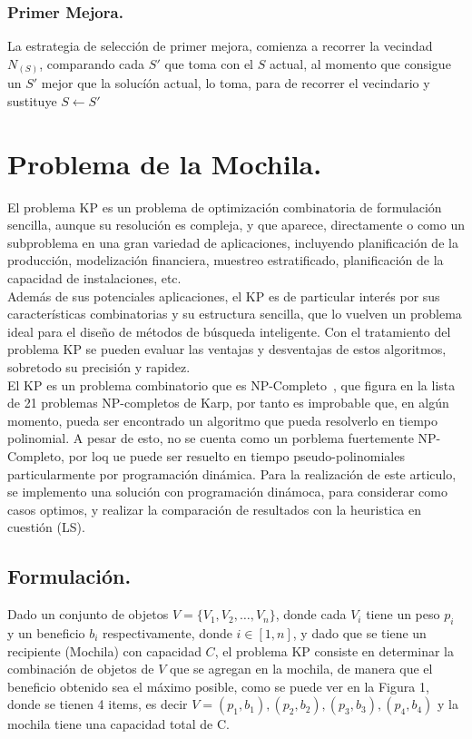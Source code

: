 \documentclass{ci5652}
\begin{document}
		\subsubsection{Primer Mejora.}
			La estrategia de selección de primer mejora, comienza a recorrer la vecindad $N_(S)$, comparando cada $S'$ que toma con el $S$ actual, al momento que consigue un $S'$ mejor que la solucíón actual, lo toma, para de recorrer el vecindario y sustituye $S \leftarrow S'$	
	
\section{Problema de la Mochila.}
	El problema KP es un problema de optimización combinatoria de formulación sencilla, aunque su resolución es compleja, y que aparece, directamente o como un subproblema en una gran variedad de aplicaciones, incluyendo  planificación de la producción, modelización financiera, muestreo estratificado, planificación de la capacidad de instalaciones, etc.\\
	Además de sus potenciales aplicaciones, el KP es de particular interés por sus características combinatorias y su estructura sencilla, que lo vuelven un problema ideal para el diseño de métodos de búsqueda inteligente. Con el tratamiento del problema KP se pueden evaluar las ventajas y desventajas de estos algoritmos, sobretodo su precisión y rapidez.\\
	El KP es un problema combinatorio que es NP-Completo~\cite{c_KP_01}, que figura en la lista de 21 problemas NP-completos de Karp, por tanto es improbable que, en algún momento, pueda ser encontrado un algoritmo que pueda resolverlo en tiempo polinomial. A pesar de esto, no se cuenta como un porblema fuertemente NP-Completo, por loq ue puede ser resuelto en tiempo pseudo-polinomiales particularmente por programación dinámica. Para la realización de este articulo, se implemento una solución con programación dinámoca, para considerar como casos optimos, y realizar la comparación de resultados con la heuristica en cuestión (LS). 
	
	\subsection{Formulación.}
	Dado un conjunto de objetos $V = \{ V_1,V_2,\ldots,V_n \}$, donde cada $V_i$ tiene un peso $p_i$ y un beneficio $b_i$ respectivamente, donde $i \in [1,n]$, y dado que se tiene un recipiente (Mochila) con capacidad $C$, el problema KP consiste en determinar la combinación de objetos de $V$ que se agregan en la mochila, de manera que el beneficio obtenido sea el máximo posible, como se puede ver en la Figura 1, donde se tienen 4 items, es decir $V = {(p_1,b_1),(p_2,b_2),(p_3,b_3),(p_4,b_4)}$ y la mochila tiene una capacidad total de C.
\end{document}
